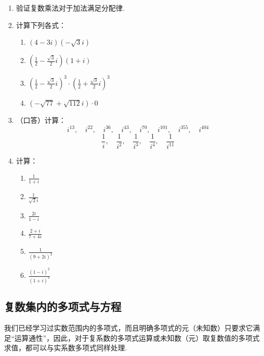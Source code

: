 \begin{ex}
\begin{enumerate}
    \item 验证复数乘法对于加法满足分配律.
    \item 计算下列各式：
\begin{multicols}{2}
\begin{enumerate}[(1)]
\item $(4-3i)(-\sqrt{3}i)$
\item $\left(\frac{1}{2}-\frac{\sqrt{3}}{2}i\right)(1+i)$
\item $\left(\frac{1}{2}-\frac{\sqrt{3}}{2}i\right)^3\cdot \left(\frac{1}{2}+\frac{\sqrt{3}}{2}i\right)^3$
\item $(-\sqrt{77}+\sqrt{112}i)\cdot 0$
\end{enumerate}
\end{multicols}

\item  （口答）计算：
\[i^{13},\quad i^{22},\quad i^{36},\quad i^{43},\quad i^{70},\quad i^{101},\quad i^{355},\quad i^{404} \]
\[\frac{1}{i},\quad \frac{1}{i^2},\quad \frac{1}{i^3},\quad \frac{1}{i^4},\quad \frac{1}{i^{11}}\]
\item     计算：
\begin{multicols}{3}
\begin{enumerate}[(1)]
    \item $\frac{1}{1+i}$
    \item $\frac{1}{\sqrt{2}i}$
    \item $\frac{2i}{1-i}$
    \item $\frac{2+i}{7+4i}$
    \item $\frac{1}{(9+2i)^2}$
    \item $\frac{(1-i)^2}{(1+i)^3}$
\end{enumerate}
\end{multicols}
\end{enumerate}
\end{ex}

\subsection{复数集内的多项式与方程}
我们已经学习过实数范围内的多项式，而且明确多项式的元（未知数）只要求它满足“运算通性”，因此，对于复系数的多项式运算或未知数（元）取复数值的多项式求值，都可以与实系数多项式同样处理.

